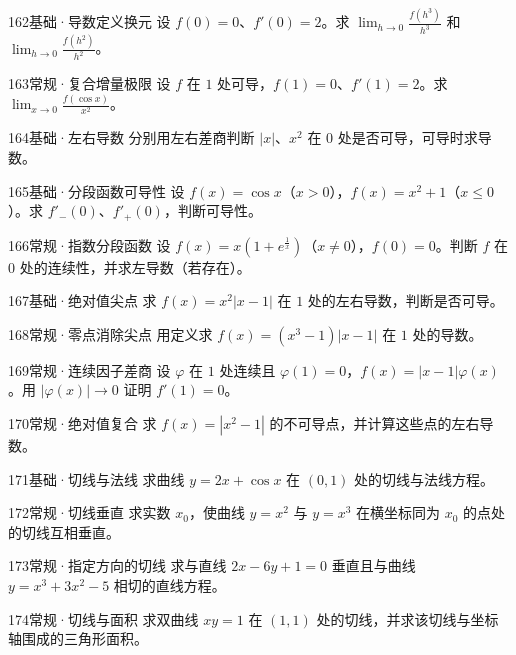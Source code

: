 \begin{exercise}{162}{基础·导数定义换元}
设 $f(0)=0$、$f'(0)=2$。求 $\lim_{h\to0}\frac{f(h^3)}{h^3}$ 和 $\lim_{h\to0}\frac{f(h^2)}{h^2}$。
\end{exercise}
\begin{exercise}{163}{常规·复合增量极限}
设 $f$ 在 $1$ 处可导，$f(1)=0$、$f'(1)=2$。求 $\lim_{x\to0}\frac{f(\cos x)}{x^2}$。
\end{exercise}
\begin{exercise}{164}{基础·左右导数}
分别用左右差商判断 $|x|$、$x^2$ 在 $0$ 处是否可导，可导时求导数。
\end{exercise}
\begin{exercise}{165}{基础·分段函数可导性}
设 $f(x)=\cos x$（$x>0$），$f(x)=x^2+1$（$x\le0$）。求 $f'_-(0)$、$f'_+(0)$，判断可导性。
\end{exercise}
\begin{exercise}{166}{常规·指数分段函数}
设 $f(x)=x(1+e^{\frac{1}{x}})$（$x\ne0$），$f(0)=0$。判断 $f$ 在 $0$ 处的连续性，并求左导数（若存在）。
\end{exercise}
\begin{exercise}{167}{基础·绝对值尖点}
求 $f(x)=x^2|x-1|$ 在 $1$ 处的左右导数，判断是否可导。
\end{exercise}
\begin{exercise}{168}{常规·零点消除尖点}
用定义求 $f(x)=(x^3-1)|x-1|$ 在 $1$ 处的导数。
\end{exercise}
\begin{exercise}{169}{常规·连续因子差商}
设 $\varphi$ 在 $1$ 处连续且 $\varphi(1)=0$，$f(x)=|x-1|\varphi(x)$。用 $|\varphi(x)|\to0$ 证明 $f'(1)=0$。
\end{exercise}
\begin{exercise}{170}{常规·绝对值复合}
求 $f(x)=|x^2-1|$ 的不可导点，并计算这些点的左右导数。
\end{exercise}
\begin{exercise}{171}{基础·切线与法线}
求曲线 $y=2x+\cos x$ 在 $(0,1)$ 处的切线与法线方程。
\end{exercise}
\begin{exercise}{172}{常规·切线垂直}
求实数 $x_0$，使曲线 $y=x^2$ 与 $y=x^3$ 在横坐标同为 $x_0$ 的点处的切线互相垂直。
\end{exercise}
\begin{exercise}{173}{常规·指定方向的切线}
求与直线 $2x-6y+1=0$ 垂直且与曲线 $y=x^3+3x^2-5$ 相切的直线方程。
\end{exercise}
\begin{exercise}{174}{常规·切线与面积}
求双曲线 $xy=1$ 在 $(1,1)$ 处的切线，并求该切线与坐标轴围成的三角形面积。
\end{exercise}
